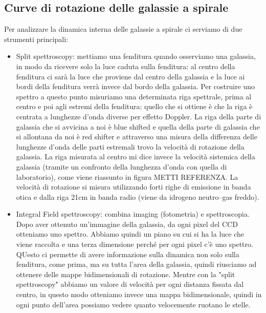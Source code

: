 \subsection{Curve di rotazione delle galassie a spirale}
Per analizzare la dinamica interna delle galassie a spirale ci serviamo di due strumenti principali:
\begin{itemize}
    \item Split spettroscopy: mettiamo una fenditura quando osserviamo una galassia, in modo da ricevere solo la luce caduta sulla fenditura: al centro della fenditura ci sarà la luce che proviene dal centro della galassia e la luce ai bordi della fenditura verrà invece dal bordo della galassia. Per costruire uno spettro a questo punto misuriamo una determinata riga spettrale, prima al centro e poi agli estremi della fenditura: quello che si ottiene è che la riga è centrata a lunghezze d’onda diverse per effetto Doppler. La riga della parte di galassia che si avvicina a noi è blue shifted e quella della parte di galassia che si allontana da noi è red shifter e attraverso una misura della differenza delle lunghezze d’onda delle parti estremali trovo la velocità di rotazione della galassia. La riga misurata al centro mi dice invece la velocità sistemica della galassia (tramite un confronto della lunghezza d’onda con quella di laboratorio), come viene riassunto in figura METTI REFERENZA. La velocità di rotazione si misura utilizzando forti righe di emissione in banda otica e dalla riga 21cm in banda radio (viene da idrogeno neutro--gas freddo). 

    \item Integral Field spettroscopy: combina imaging (fotometria) e spettroscopia. Dopo aver ottenuto un’immagine della galassia, da ogni pixel del CCD otteniamo uno spettro. Abbiamo quindi un piano su cui si ha la luce che viene raccolta e una terza dimensione perché per ogni pixel c'è uno spettro. QUesto ci permette di avere informazione sulla dinamica non solo sulla fenditura, come prima, ma su tutta l’area della galassia, quindi riusciamo ad ottenere delle mappe bidimensionali di rotazione. Mentre con la "split spettroscopy" abbiamo un valore di velocità per ogni distanza fissata dal centro, in questo modo otteniamo invece una mappa bidimensionale, quindi in ogni punto dell’area possiamo vedere quanto velocemente ruotano le stelle.
\end{itemize}

